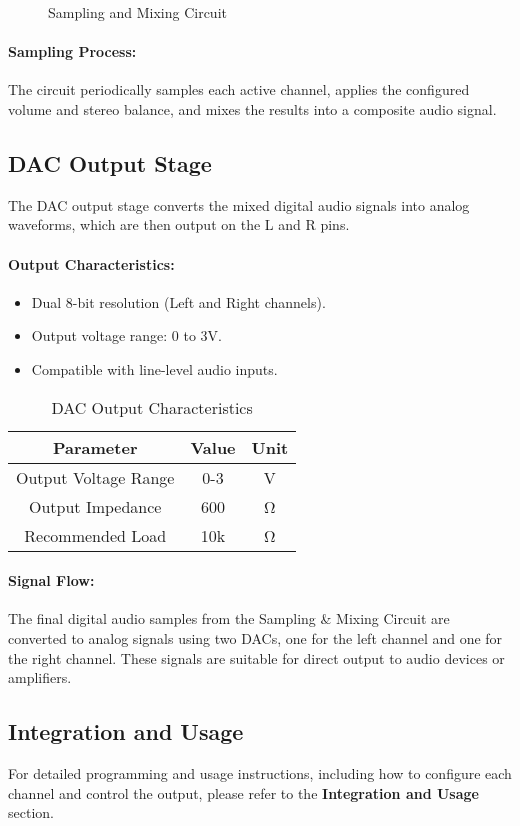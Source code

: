 \begin{figure}[h!]
    \centering
    \caption{Sampling and Mixing Circuit}
\end{figure}

\paragraph{Sampling Process:}
The circuit periodically samples each active channel, applies the configured volume and stereo balance, and mixes the results into a composite audio signal.

\subsection{DAC Output Stage}
The DAC output stage converts the mixed digital audio signals into analog waveforms, which are then output on the L and R pins.

\paragraph{Output Characteristics:}
\begin{itemize}
    \item Dual 8-bit resolution (Left and Right channels).
    \item Output voltage range: 0 to 3V.
    \item Compatible with line-level audio inputs.
\end{itemize}

\begin{table}[h!]
    \centering
    \begin{tabular}{|c|c|c|}
        \hline
        \textbf{Parameter} & \textbf{Value} & \textbf{Unit} \\
        \hline
        Output Voltage Range & 0-3 & V \\
        Output Impedance & 600 & Ω \\
        Recommended Load & 10k & Ω \\
        \hline
    \end{tabular}
    \caption{DAC Output Characteristics}
\end{table}

\paragraph{Signal Flow:}
The final digital audio samples from the Sampling \& Mixing Circuit are converted to analog signals using two DACs, one for the left channel and one for the right channel. These signals are suitable for direct output to audio devices or amplifiers.

\subsection{Integration and Usage}
For detailed programming and usage instructions, including how to configure each channel and control the output, please refer to the \textbf{Integration and Usage} section.
